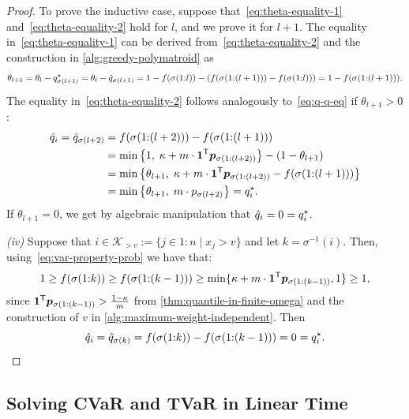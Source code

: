 \begin{proof}
To prove the inductive case, suppose that~\eqref{eq:theta-equality-1} and~\eqref{eq:theta-equality-2} hold for $l$, and we prove it for $l+1$. The equality in~\eqref{eq:theta-equality-1} can be derived from~\eqref{eq:theta-equality-2} and the construction in \cref{alg:greedy-polymatroid} as
\begin{align*}
  \theta_{l+1}
  = \theta_l - q^{\star}_{\sigma(l+1)} 
    = \theta_l - \hat{q}_{\sigma(l+1)}
    = 1 - f(\sigma(1{:}l)) - \left(  f(\sigma(1{:}(l+1))) - f(\sigma(1{:}l)) \right) 
  = 1 - f(\sigma(1{:}(l+1))).
\end{align*}
The equality in~\eqref{eq:theta-equality-2} follows analogously to~\eqref{eq:q-q-eq} if $\theta_{l+1} > 0$:
\begin{equation} \label{eq:q-q-eq-2}
  \begin{aligned}
\hat{q}_{i} = \hat{q}_{\sigma(l+2)}
  &= f ( \sigma(1{:}(l+2) )) - f(\sigma(1{:}(l+1))) \\
  &= \min \left\{  1,\; \kappa + m \cdot \bm{1}^{\mathsf{T}} \bm{p}_{\sigma(1{:}(l+2))} \right\} - (1-\theta_{l+1}) \\
  &= \min \left\{\theta_{l+1}, \;\kappa + m \cdot \bm{1}^{\mathsf{T}} \bm{p}_{\sigma(1{:}(l+2))} - f(\sigma(1{:}(l+1))) \right\} \\
  &= \min \left\{\theta_{l+1}, \; m \cdot p_{\sigma(l+2)}  \right\} 
  = q_i^{\star}.
  \end{aligned}
\end{equation}
If $\theta_{l+1} = 0$, we get by algebraic manipulation that $\hat{q}_i = 0 = q^{\star}_i$.


\emph{(iv)} Suppose that $i \in \mathcal{K}_{>v} := \{ j \in 1{:}n \mid x_j > v \}$ and let $k = \sigma^{-1}(i)$. Then, using~\eqref{eq:var-property-prob} we have that:
\begin{align*}
  1
  \ge f(\sigma(1{:}k))
  \ge f(\sigma(1{:}(k-1))) 
  \ge \min \{\kappa + m \cdot \bm{1}^{\mathsf{T}} \bm{p}_{\sigma(1{:}(k-1))}, 1\}
  \ge 1,
\end{align*}
since $\bm{1}^{\mathsf{T}}\bm{p}_{\sigma(1{:}(k-1))} > \frac{1-\kappa}{m}$ from \cref{thm:quantile-in-finite-omega} and the construction of $v$ in \cref{alg:maximum-weight-independent}. Then
\[
  \hat{q}_i = \hat{q}_{\sigma(k)}
  =  f(\sigma(1{:}k)) - f(\sigma(1{:}(k-1)))
  = 0 = q^{\star}_i.
\]

\end{proof}

\subsection{Solving CVaR and TVaR in Linear Time} \label{sec:cvar-tvar-are}

